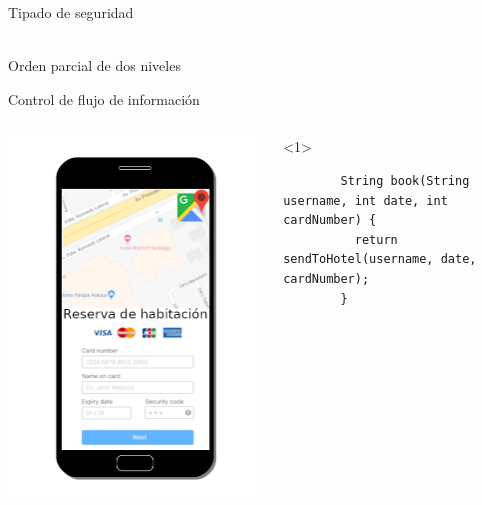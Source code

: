 \documentclass[aspectratio=169,10pt]{beamer}
\begin{document}
\begin{frame}[fragile]{Tipado de seguridad}
	\begin{center}
		 \\
		Orden parcial de dos niveles
	\end{center}
\end{frame}

\begin{frame}[fragile]{Control de flujo de información}
  \begin{columns}[T,onlytextwidth]
    \includegraphics[width=1.0\textwidth]{images/book.png}
    \vspace{1cm}
    \begin{onlyenv}<1>
      \begin{lstlisting}
        String book(String username, int date, int cardNumber) {
          return sendToHotel(username, date, cardNumber);
        }


\end{lstlisting}
\end{onlyenv}
\end{columns}
\end{frame}
\end{document}
